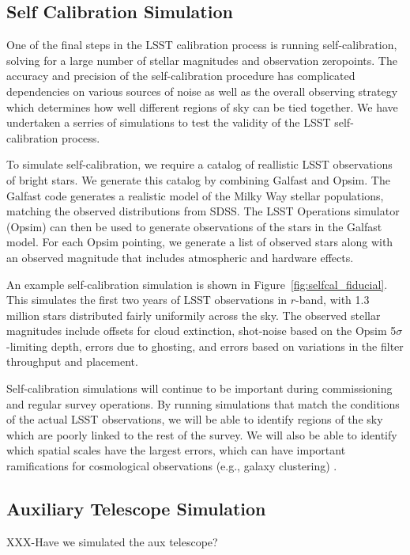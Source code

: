 \documentclass[12pt,preprint]{aastex}
\begin{document}
\subsection{Self Calibration Simulation}

One of the final steps in the LSST calibration process is running self-calibration, solving for a large number of stellar magnitudes and observation zeropoints.  The accuracy and precision of the self-calibration procedure has complicated dependencies on various sources of noise as well as the overall observing strategy which determines how well different regions of sky can be tied together.  We have undertaken a serries of simulations to test the validity of the LSST self-calibration process.

To simulate self-calibration, we require a catalog of reallistic LSST observations of bright stars.  We generate this catalog by combining Galfast and Opsim.  The Galfast code generates a realistic model of the Milky Way stellar populations, matching the observed distributions from SDSS.  The LSST Operations simulator (Opsim) can then be used to generate observations of the stars in the Galfast model.  For each Opsim pointing, we generate a list of observed stars along with an observed magnitude that includes atmospheric and hardware effects.  

An example self-calibration simulation is shown in Figure~\ref{fig:selfcal_fiducial}.  This simulates the first two years of LSST observations in $r$-band, with 1.3 million stars distributed fairly uniformily across the sky.  The observed stellar magnitudes include offsets for cloud extinction, shot-noise based on the Opsim 5$\sigma$-limiting depth, errors due to ghosting, and errors based on variations in the filter throughput and placement.  

Self-calibration simulations will continue to be important during commissioning and regular survey operations.  By running simulations that match the conditions of the actual LSST observations, we will be able to identify regions of the sky which are poorly linked to the rest of the survey.  We will also be able to identify which spatial scales have the largest errors, which can have important ramifications for cosmological observations (e.g., galaxy clustering) \citep{Huterer13}. 


\subsection{Auxiliary Telescope Simulation}
XXX-Have we simulated the aux telescope?
\end{document}
